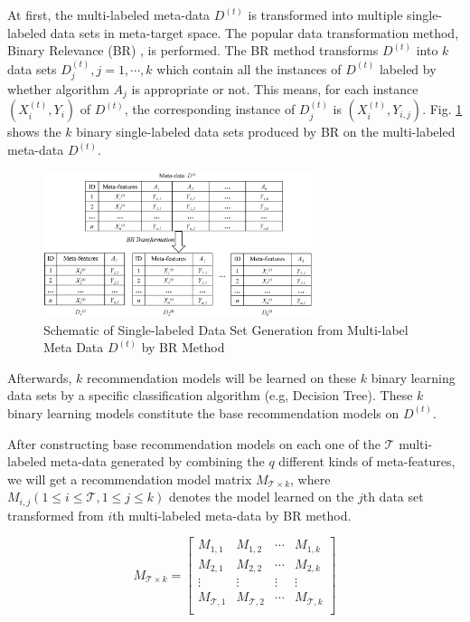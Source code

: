 \documentclass[prodmode,acmtkdd]{acmsmall}
\begin{document}
At first, the multi-labeled meta-data $D^{(t)}$ is transformed into
multiple single-labeled data sets in meta-target space. The popular
data transformation method, Binary Relevance (BR)
\cite{tsoumakas2010mining}, is performed. The BR method transforms
$D^{(t)}$ into $k$ data sets $D_{j}^{(t)}, j= 1,\cdots,k$ which contain all
the instances of $D^{(t)}$ labeled by whether algorithm $A_j$ is
appropriate or not. This means, for each instance $(X_i^{(t)}, Y_i)$ of
$D^{(t)}$, the corresponding instance of $D_{j}^{(t)}$ is $(X_i^{(t)}, Y_{i,j})$.
Fig. \ref{Fig:dataTransformation} shows the $k$ binary
single-labeled data sets produced by BR on the multi-labeled
meta-data $D^{(t)}$.
\begin{figure}[!h]
	\centering
	\includegraphics[width=0.7\textwidth]{Figures/DataTransformation}
	\caption{Schematic of Single-labeled Data Set Generation from Multi-label Meta Data $D^{(t)}$ by BR Method}\label{Fig:dataTransformation}
\end{figure}

Afterwards, $k$ recommendation models will be learned on these $k$
binary learning data sets by a specific classification algorithm
(e.g, Decision Tree). These $k$ binary learning models constitute
the base recommendation models on $D^{(t)}$.

After constructing base recommendation models on each one of the $\mathcal{T}$
multi-labeled meta-data generated by combining the $q$ different
kinds of meta-features, we will get a recommendation model matrix
$M_{\mathcal{T}\times k}$, where $M_{i,j} (1\leq i\leq \mathcal{T}, 1\leq j \leq k)$
denotes the model learned on the $j$th data set transformed from
$i$th multi-labeled meta-data by BR method.

\begin{equation}
    M_{\mathcal{T}\times k} =\left[
  \begin{array}{cccc}
    M_{1,1} & M_{1,2} & \cdots & M_{1,k} \\
    M_{2,1} & M_{2,2} & \cdots & M_{2,k} \\
    \vdots & \vdots &  \vdots & \vdots \\
    M_{\mathcal{T},1} & M_{\mathcal{T},2} & \cdots & M_{\mathcal{T},k} \\
  \end{array}
    \right]
\end{equation}
\end{document}
